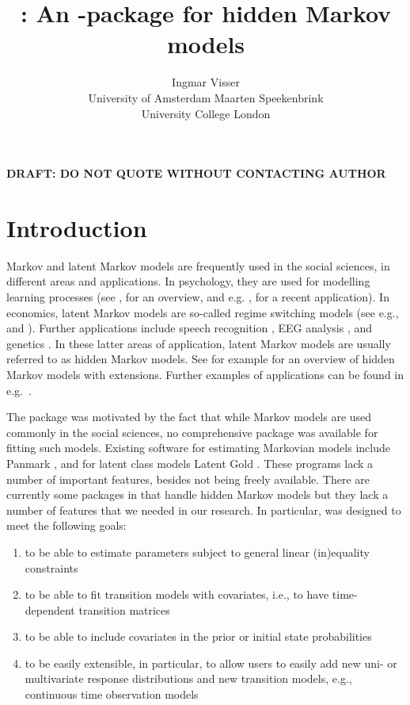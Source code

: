 \documentclass[article]{jss}
\author{Ingmar Visser\\University of Amsterdam \And 
        Maarten Speekenbrink\\University College London}
\title{\pkg{depmixS4} : An \proglang{R}-package for hidden Markov models}
\begin{document}


\begin{center}
\bf{DRAFT: DO NOT QUOTE WITHOUT CONTACTING AUTHOR}
\end{center}

\section{Introduction}

Markov and latent Markov models are frequently used in the social
sciences, in different areas and applications.  In psychology, they
are used for modelling learning processes (see \citealp{Wickens1982},
for an overview, and e.g. \citealp{Schmittmann2006}, for a recent
application).  In economics, latent Markov models are so-called regime
switching models (see e.g., \citealp{Kim1994} and
\citealp{Ghysels1994}).  Further applications include speech
recognition \citep{Rabiner1989}, EEG analysis \citep{Rainer2000}, and
genetics \citep{Krogh1998}.  In these latter areas of application,
latent Markov models are usually referred to as hidden Markov models. 
See for example \citet{Fruhwirth2006} for an overview of hidden Markov models 
with extensions. Further examples of applications can be found in e.g.\
\citet[][chapter~1]{Cappe2005}.  

The  package was motivated by the fact that while Markov
models are used commonly in the social sciences, no comprehensive
package was available for fitting such models.  Existing software for
estimating Markovian models include Panmark \citep{Pol1996}, and for
latent class models Latent Gold \citep{Vermunt2003}. These programs
lack a number of important features, besides not being freely
available. There are currently some packages in  that
handle hidden Markov models but they lack a number of features that we
needed in our research. In particular, \pkg{depmixS4} was designed to
meet the following goals:

\begin{enumerate}
	
	\item to be able to estimate parameters subject to general
	linear (in)equality constraints
	
	\item to be able to fit transition models with covariates, i.e.,
	to have time-dependent transition matrices
	
	\item to be able to include covariates in the prior or initial
	state probabilities
	
	\item to be easily extensible, in particular, to allow users to
	easily add new uni- or multivariate response distributions and
	new transition models, e.g., continuous time observation models
	
\end{enumerate}
\end{document}
